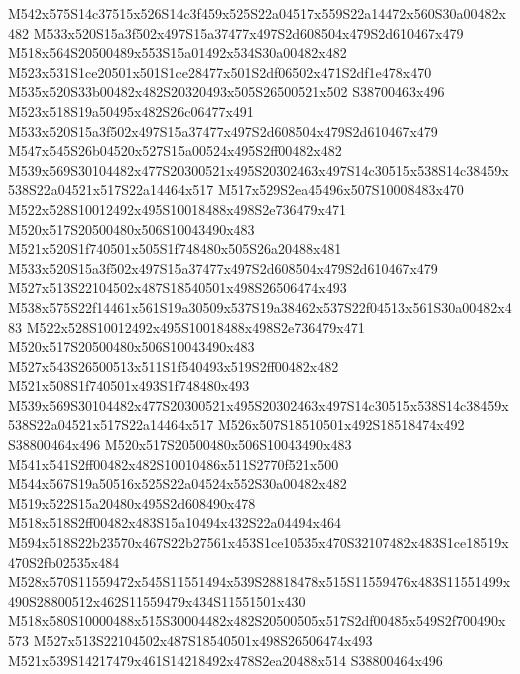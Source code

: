 \documentclass{article}
\begin{document}
\begin{multicols}{2}



M542x575S14c37515x526S14c3f459x525S22a04517x559S22a14472x560S30a00482x482 M533x520S15a3f502x497S15a37477x497S2d608504x479S2d610467x479 M518x564S20500489x553S15a01492x534S30a00482x482 M523x531S1ce20501x501S1ce28477x501S2df06502x471S2df1e478x470 M535x520S33b00482x482S20320493x505S26500521x502 S38700463x496 M523x518S19a50495x482S26c06477x491 M533x520S15a3f502x497S15a37477x497S2d608504x479S2d610467x479 M547x545S26b04520x527S15a00524x495S2ff00482x482 M539x569S30104482x477S20300521x495S20302463x497S14c30515x538S14c38459x538S22a04521x517S22a14464x517 M517x529S2ea45496x507S10008483x470 M522x528S10012492x495S10018488x498S2e736479x471 M520x517S20500480x506S10043490x483 M521x520S1f740501x505S1f748480x505S26a20488x481 M533x520S15a3f502x497S15a37477x497S2d608504x479S2d610467x479 M527x513S22104502x487S18540501x498S26506474x493 M538x575S22f14461x561S19a30509x537S19a38462x537S22f04513x561S30a00482x483 M522x528S10012492x495S10018488x498S2e736479x471 M520x517S20500480x506S10043490x483 M527x543S26500513x511S1f540493x519S2ff00482x482 M521x508S1f740501x493S1f748480x493 M539x569S30104482x477S20300521x495S20302463x497S14c30515x538S14c38459x538S22a04521x517S22a14464x517 M526x507S18510501x492S18518474x492 S38800464x496 M520x517S20500480x506S10043490x483 M541x541S2ff00482x482S10010486x511S2770f521x500 M544x567S19a50516x525S22a04524x552S30a00482x482 M519x522S15a20480x495S2d608490x478 M518x518S2ff00482x483S15a10494x432S22a04494x464 M594x518S22b23570x467S22b27561x453S1ce10535x470S32107482x483S1ce18519x470S2fb02535x484 M528x570S11559472x545S11551494x539S28818478x515S11559476x483S11551499x490S28800512x462S11559479x434S11551501x430 M518x580S10000488x515S30004482x482S20500505x517S2df00485x549S2f700490x573 M527x513S22104502x487S18540501x498S26506474x493 M521x539S14217479x461S14218492x478S2ea20488x514 S38800464x496



\end{multicols}
\end{document}
